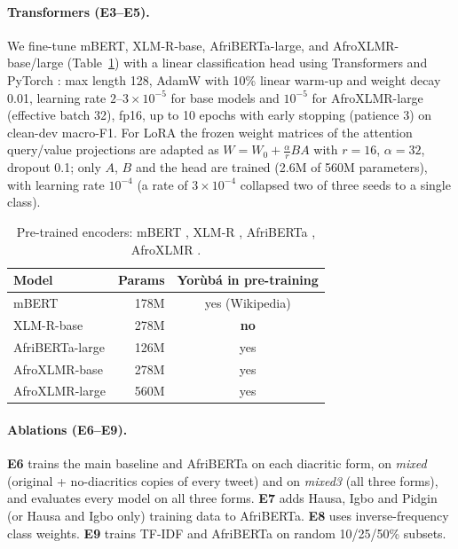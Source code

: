 \documentclass[11pt]{article}
\begin{document}
\paragraph{Transformers (E3--E5).} We fine-tune mBERT, XLM-R-base, AfriBERTa-large, and AfroXLMR-base/large (Table~\ref{tab:models}) with a linear classification head using Transformers \citep{wolf-etal-2020-transformers} and PyTorch \citep{paszke-etal-2019-pytorch}: max length 128, AdamW with 10\% linear warm-up and weight decay 0.01, learning rate $2$--$3\times10^{-5}$ for base models and $10^{-5}$ for AfroXLMR-large (effective batch 32), fp16, up to 10 epochs with early stopping (patience 3) on clean-dev macro-F1. For LoRA \citep{hu-etal-2022-lora,mangrulkar-etal-2022-peft} the frozen weight matrices of the attention query/value projections are adapted as $W = W_0 + \tfrac{\alpha}{r} BA$ with $r=16$, $\alpha=32$, dropout 0.1; only $A$, $B$ and the head are trained (2.6M of 560M parameters), with learning rate $10^{-4}$ (a rate of $3\times10^{-4}$ collapsed two of three seeds to a single class).

\begin{table}[t]
\centering\small
\begin{tabular}{lrc}
\toprule
Model & Params & Yorùbá in pre-training \\
\midrule
mBERT & 178M & yes (Wikipedia) \\
XLM-R-base & 278M & \textbf{no} \\
AfriBERTa-large & 126M & yes \\
AfroXLMR-base & 278M & yes \\
AfroXLMR-large & 560M & yes \\
\bottomrule
\end{tabular}
\caption{Pre-trained encoders: mBERT \citep{devlin-etal-2019-bert}, XLM-R \citep{conneau-etal-2020-unsupervised}, AfriBERTa \citep{ogueji-etal-2021-small}, AfroXLMR \citep{alabi-etal-2022-adapting}.}
\label{tab:models}
\end{table}

\paragraph{Ablations (E6--E9).} \textbf{E6} trains the main baseline and AfriBERTa on each diacritic form, on \emph{mixed} (original + no-diacritics copies of every tweet) and on \emph{mixed3} (all three forms), and evaluates every model on all three forms. \textbf{E7} adds Hausa, Igbo and Pidgin (or Hausa and Igbo only) training data to AfriBERTa. \textbf{E8} uses inverse-frequency class weights. \textbf{E9} trains TF-IDF and AfriBERTa on random 10/25/50\% subsets.
\end{document}
